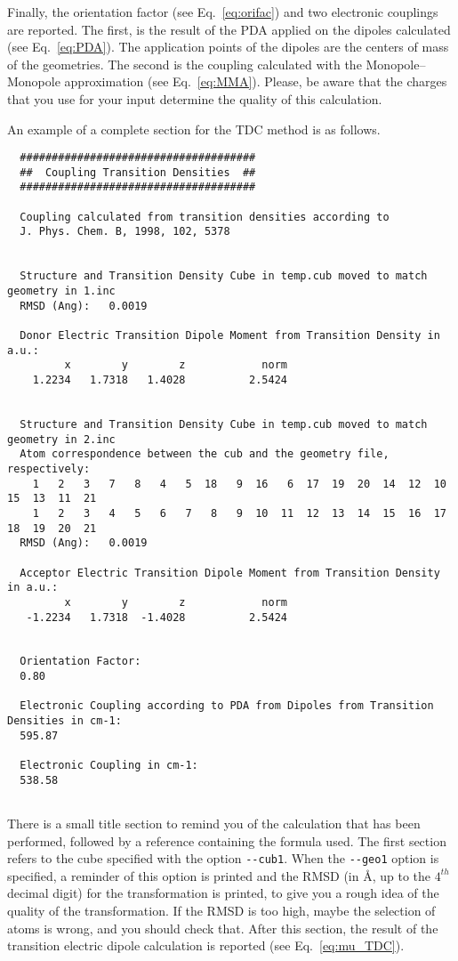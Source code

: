 \documentclass[a4paper]{article}
\begin{document}
Finally, the orientation factor (see Eq.~\ref{eq:orifac}) and two electronic couplings are reported. The first, is the result of the PDA applied on the dipoles calculated (see Eq.~\ref{eq:PDA}). The application points of the dipoles are the centers of mass of the geometries. The second is the coupling calculated with the Monopole--Monopole approximation (see Eq.~\ref{eq:MMA}).
Please, be aware that the charges that you use for your input determine the quality of this calculation.

An example of a complete section for the TDC method is as follows.

\begin{verbatim}
  #####################################
  ##  Coupling Transition Densities  ##
  #####################################
  
  Coupling calculated from transition densities according to
  J. Phys. Chem. B, 1998, 102, 5378
  
  
  Structure and Transition Density Cube in temp.cub moved to match geometry in 1.inc
  RMSD (Ang):   0.0019
  
  Donor Electric Transition Dipole Moment from Transition Density in a.u.:
         x        y        z            norm
    1.2234   1.7318   1.4028          2.5424
  
  
  Structure and Transition Density Cube in temp.cub moved to match geometry in 2.inc
  Atom correspondence between the cub and the geometry file, respectively:
    1   2   3   7   8   4   5  18   9  16   6  17  19  20  14  12  10  15  13  11  21 
    1   2   3   4   5   6   7   8   9  10  11  12  13  14  15  16  17  18  19  20  21 
  RMSD (Ang):   0.0019
  
  Acceptor Electric Transition Dipole Moment from Transition Density in a.u.:
         x        y        z            norm
   -1.2234   1.7318  -1.4028          2.5424
  
  
  Orientation Factor:
  0.80
    
  Electronic Coupling according to PDA from Dipoles from Transition Densities in cm-1:
  595.87    
  
  Electronic Coupling in cm-1:
  538.58    
  
\end{verbatim}

There is a small title section to remind you of the calculation that has been performed, followed by a reference containing the formula used. The first section refers to the cube specified with the option \verb|--cub1|. When the \verb|--geo1| option is specified, a reminder of this option is printed and the RMSD (in \AA{}, up to the $4^{th}$ decimal digit) for the transformation is printed, to give you a rough idea of the quality of the transformation. If the RMSD is too high, maybe the selection of atoms is wrong, and you should check that.
After this section, the result of the transition electric dipole calculation is reported (see Eq.~\ref{eq:mu_TDC}).
\end{document}
